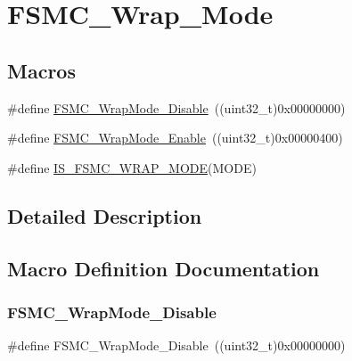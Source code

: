 \hypertarget{group___f_s_m_c___wrap___mode}{}\section{F\+S\+M\+C\+\_\+\+Wrap\+\_\+\+Mode}
\label{group___f_s_m_c___wrap___mode}
\subsection*{Macros}
\begin{DoxyCompactItemize}
\item 
\#define \mbox{\hyperlink{group___f_s_m_c___wrap___mode_ga6041f0d3055ea3811a5a19560092f266}{F\+S\+M\+C\+\_\+\+Wrap\+Mode\+\_\+\+Disable}}~((uint32\+\_\+t)0x00000000)
\item 
\#define \mbox{\hyperlink{group___f_s_m_c___wrap___mode_gad07eb0ae0362b2f94071d0dab6473fda}{F\+S\+M\+C\+\_\+\+Wrap\+Mode\+\_\+\+Enable}}~((uint32\+\_\+t)0x00000400)
\item 
\#define \mbox{\hyperlink{group___f_s_m_c___wrap___mode_ga0751d74b7fb1e17f6cedea091e8ebfc8}{I\+S\+\_\+\+F\+S\+M\+C\+\_\+\+W\+R\+A\+P\+\_\+\+M\+O\+DE}}(M\+O\+DE)
\end{DoxyCompactItemize}


\subsection{Detailed Description}


\subsection{Macro Definition Documentation}
\mbox{\label{group___f_s_m_c___wrap___mode_ga6041f0d3055ea3811a5a19560092f266}} 
\subsubsection{\texorpdfstring{FSMC\_WrapMode\_Disable}{FSMC\_WrapMode\_Disable}}
{\footnotesize\ttfamily \#define F\+S\+M\+C\+\_\+\+Wrap\+Mode\+\_\+\+Disable~((uint32\+\_\+t)0x00000000)}

\mbox{\label{group___f_s_m_c___wrap___mode_gad07eb0ae0362b2f94071d0dab6473fda}} 

